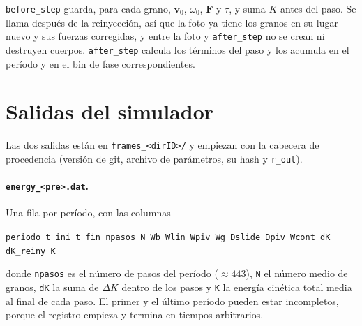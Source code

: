 \documentclass[11pt,a4paper]{article}
\newcommand{\vect}[1]{\mathbf{#1}}
\newcommand{\F}{\vect{F}}
\newcommand{\vv}{\vect{v}}
\newcommand{\code}[1]{\texttt{#1}}
\begin{document}
\begin{center}
\end{center}

\code{before\_step} guarda, para cada grano, $\vv_0$, $\omega_0$, $\F$ y
$\tau$, y suma $K$ antes del paso. Se llama después de la reinyección, así
que la foto ya tiene los granos en su lugar nuevo y sus fuerzas
corregidas, y entre la foto y \code{after\_step} no se crean ni destruyen
cuerpos. \code{after\_step} calcula los términos del paso y los acumula en
el período y en el bin de fase correspondientes.

\section{Salidas del simulador}

Las dos salidas están en \code{frames\_<dirID>/} y empiezan con la
cabecera de procedencia (versión de git, archivo de parámetros, su hash y
\code{r\_out}).

\paragraph{\code{energy\_<pre>.dat}.} Una fila por período, con las
columnas
\begin{center}
\code{periodo t\_ini t\_fin npasos N Wb Wlin Wpiv Wg Dslide Dpiv Wcont dK
dK\_reiny K}
\end{center}
donde \code{npasos} es el número de pasos del período ($\approx 443$),
\code{N} el número medio de granos, \code{dK} la suma de $\Delta K$ dentro
de los pasos y \code{K} la energía cinética total media al final de cada
paso. El primer y el último período pueden estar incompletos, porque el
registro empieza y termina en tiempos arbitrarios.
\end{document}
